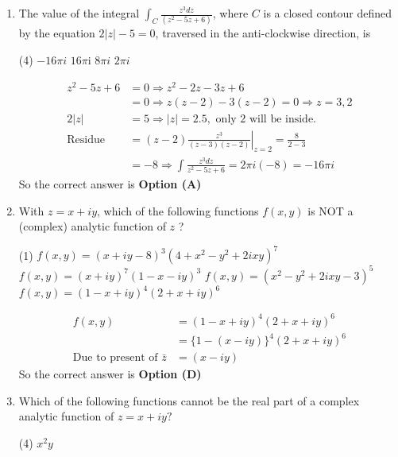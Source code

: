 \begin{enumerate}[label=\color{ocre}\textbf{\arabic*.}]
\begin{answer}
	\end{answer}
	\item The value of the integral $\int_{C} \frac{z^{3} d z}{\left(z^{2}-5 z+6\right)}$, where $C$ is a closed contour defined by the equation $2|z|-5=0$, traversed in the anti-clockwise direction, is
	{}
	\begin{tasks}(4)
		\task[\textbf{A.}] $-16 \pi i$
		\task[\textbf{B.}] $16 \pi \mathrm{i}$
		\task[\textbf{C.}] $8 \pi i$
		\task[\textbf{D.}] $2 \pi i$
	\end{tasks}
	\begin{answer}
		\begin{align*}
		z^{2}-5 z+6&=0 \Rightarrow z^{2}-2 z-3 z+6\\&=0 \Rightarrow z(z-2)-3(z-2)=0 \Rightarrow z=3,2\\
		2|z|&=5 \Rightarrow|z|=2.5,\text{ only 2 will be inside.}\\
		\text{Residue }&=\left.(z-2) \frac{z^{3}}{(z-3)(z-2)}\right|_{z=2}=\frac{8}{2-3}\\&=-8 \Rightarrow \int \frac{z^{3} d z}{z^{2}-5 z+6}=2 \pi i(-8)=-16 \pi i
		\end{align*}
		So the correct answer is \textbf{Option (A)}
	\end{answer}
	\item  With $z=x+i y$, which of the following functions $f(x, y)$ is NOT a (complex) analytic function of $z$ ?
	{}
	\begin{tasks}(1)
		\task[\textbf{A.}] $f(x, y)=(x+i y-8)^{3}\left(4+x^{2}-y^{2}+2 i x y\right)^{7}$
		\task[\textbf{B.}] $f(x, y)=(x+i y)^{7}(1-x-i y)^{3}$
		\task[\textbf{C.}] $f(x, y)=\left(x^{2}-y^{2}+2 i x y-3\right)^{5}$
		\task[\textbf{D.}] $f(x, y)=(1-x+i y)^{4}(2+x+i y)^{6}$
	\end{tasks}
	\begin{answer}
		\begin{align*}
		f(x, y)&=(1-x+i y)^{4}(2+x+i y)^{6}\\&=\{1-(x-i y)\}^{4}(2+x+i y)^{6}\\
		\text{Due to present of }\bar{z}&=(x-i y)
		\end{align*}
		So the correct answer is \textbf{Option (D)}
	\end{answer}
	\item  Which of the following functions cannot be the real part of a complex analytic function of $z=x+i y ?$
	{}
	\begin{tasks}(4)
		\task[\textbf{A.}] $x^{2} y$

\end{tasks}
\end{enumerate}
